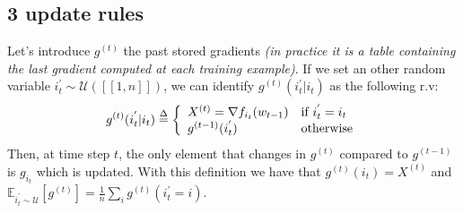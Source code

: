 \documentclass[12pt]{report}
\begin{document}
\subsection{3 update rules}
Let's introduce $g^{(t)}$ the past stored gradients \textit{(in practice it is a table containing the last gradient computed at each training example)}. If we set an other random variable $i_t^{'} \sim \mathcal{U}([\![1,n]\!])$, we can identify $g^{(t)}(i_t^{'} |i_t)$ as the following r.v:
$$
 g^{(t)}(i_t^{'} |i_t) \mathrel{\stackrel{\Delta}{=}} \left\{
    \begin{array}{ll}
        X^{(t)} = \nabla f_{i_t}(w_{t-1}) & \mbox{if } i_t^{'}=i_t \\
        g^{(t-1)}(i_t^{'}) & \mbox{otherwise}
    \end{array}
\right.
$$
Then, at time step $t$, the only element that changes in $g^{(t)}$ compared to $g^{(t-1)}$ is $g_{i_t}$ which is updated. With this definition we have that $g^{(t)}(i_t) = X^{(t)}$ and $\mathbb{E}_{i_t^{'} \sim \mathcal{U}}[g^{(t)}] = \frac{1}{n} \sum_{i} g^{(t)}(i_t^{'}=i)$.
\end{document}
